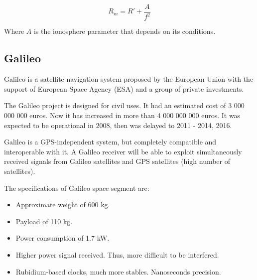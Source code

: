 \documentclass[../main.tex]{subfiles}
\begin{document}
$$
	R_m = R' + \frac {A} {f^2}
$$

Where $A$ is the ionosphere parameter that depends on its conditions.

\subsection{Galileo}

Galileo is a satellite navigation system proposed by the European Union with the support of European Space Agency (ESA) and a group of private investments.

The Galileo project is designed for civil uses. It had an estimated cost of 3 000 000 000 euros. Now it has increased in more than 4 000 000 000 euros. It was expected to be operational in 2008, then was delayed to 2011 - 2014, 2016.

Galileo is a GPS-independent system, but completely compatible and interoperable with it. A Galileo receiver will be able to exploit simultaneously received signals from Galileo satellites and GPS satellites (high number of satellites).

The specifications of Galileo space segment are:
\begin{itemize}
	\item Approximate weight of 600 kg.
	\item Payload of 110 kg.
	\item Power consumption of 1.7 kW.
	\item Higher power signal received. Thus, more difficult to be interfered.
	\item Rubidium-based clocks, much more stables. Nanoseconds precision.
\end{itemize}
\end{document}

